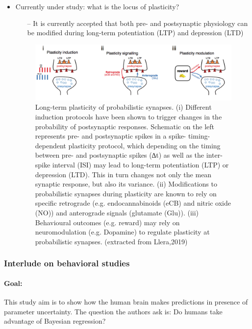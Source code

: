 \documentclass[main]{subfiles}
\begin{document}
\begin{itemize}
    \item Currently under study: what is the locus of plasticity? 
        \begin{itemize}
            \item [--] It is currently accepted that both pre- and postsynaptic physiology can be modified during long-term potentiation (LTP) and depression (LTD)
        \end{itemize}
        
     \begin{figure}[H]
    	\centering
    	\includegraphics[width=0.9\linewidth]{05_LearningAsBayesianInference/figures/longterm_plasticity.png}
    	\caption{Long-term plasticity of probabilistic synapses. (i) Different induction protocols have been shown to trigger changes in the probability of postsynaptic responses. Schematic on the left represents pre- and postsynaptic spikes in a spike- timing-dependent plasticity protocol, which depending on the timing between pre- and postsynaptic spikes (∆t) as well as the inter-spike interval (ISI) may lead to long-term potentiation (LTP) or depression (LTD). This in turn changes not only the mean synaptic response, but also its variance. (ii) Modifications to probabilistic synapses during plasticity are known to rely on specific retrograde (e.g. endocannabinoids (eCB) and nitric oxide (NO)) and anterograde signals (glutamate (Glu)). (iii) Behavioural outcomes (e.g. reward) may rely on neuromodulation (e.g. Dopamine) to regulate plasticity at probabilistic synapses. (extracted from Llera,2019)} 
    	\label{fig:synaptic_tx}
    \end{figure}
\end{itemize}

\subsubsection{Interlude on behavioral studies}
\paragraph{Goal:} This study aim is to show how the human brain makes predictions in presence of parameter uncertainty. The question the authors ask is: Do humans take advantage of Bayesian regression?
\end{document}
